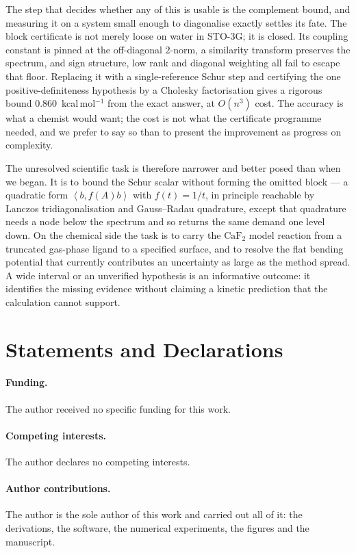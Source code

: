 \documentclass[11pt,a4paper]{article}
\theoremstyle{plain}
\theoremstyle{definition}
\theoremstyle{remark}
\newcommand{\ip}[2]{\left\langle #1,#2\right\rangle}
\begin{document}
The step that decides whether any of this is usable is the complement bound, and
measuring it on a system small enough to diagonalise exactly settles its fate. The
block certificate is not merely loose on water in STO-3G; it is closed. Its
coupling constant is pinned at the off-diagonal $2$-norm, a similarity transform
preserves the spectrum, and sign structure, low rank and diagonal weighting all
fail to escape that floor. Replacing it with a single-reference Schur step and
certifying the one positive-definiteness hypothesis by a Cholesky factorisation
gives a rigorous bound $0.860$~kcal\,mol$^{-1}$ from the exact answer, at $O(n^3)$
cost. The accuracy is what a chemist would want; the cost is not what the
certificate programme needed, and we prefer to say so than to present the
improvement as progress on complexity.

The unresolved scientific task is therefore narrower and better posed than when we
began. It is to bound the Schur scalar without forming the omitted block --- a
quadratic form $\ip{b}{f(A)b}$ with $f(t)=1/t$, in principle reachable by Lanczos
tridiagonalisation and Gauss--Radau quadrature, except that quadrature needs a node
below the spectrum and so returns the same demand one level down. On the chemical
side the task is to carry the $\mathrm{CaF_2}$ model reaction from a truncated
gas-phase ligand to a specified surface, and to resolve the flat bending potential
that currently contributes an uncertainty as large as the method spread. A wide
interval or an unverified hypothesis is an informative outcome: it identifies the
missing evidence without claiming a kinetic prediction that the calculation cannot
support.

\section*{Statements and Declarations}

\paragraph{Funding.}
The author received no specific funding for this work.

\paragraph{Competing interests.}
The author declares no competing interests.

\paragraph{Author contributions.}
The author is the sole author of this work and carried out all of it: the
derivations, the software, the numerical experiments, the figures and the
manuscript.
\end{document}
